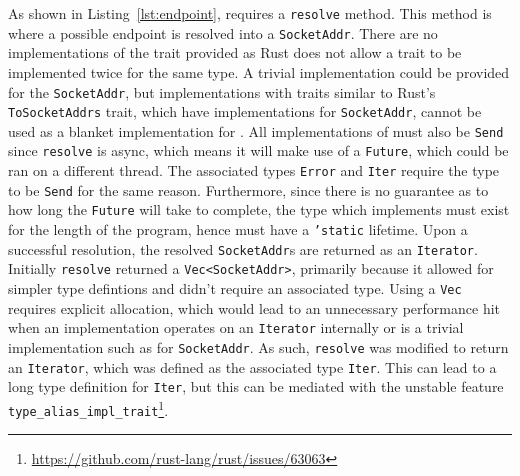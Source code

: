 As shown in Listing~\ref{lst:endpoint}, \Endpoint{} requires a \texttt{resolve} method.
This method is where a possible endpoint is resolved into a \texttt{SocketAddr}.
There are no implementations of the trait provided as Rust does not allow a trait to be implemented twice for the same
type.
A trivial implementation could be provided for the \texttt{SocketAddr}, but implementations with traits similar to
Rust's \texttt{ToSocketAddrs} trait, which have implementations for \texttt{SocketAddr}, cannot be used as a blanket
implementation for \Endpoint{}.
All implementations of \Endpoint{} must also be \texttt{Send} since \texttt{resolve} is async, which means it will
make use of a \texttt{Future}, which could be ran on a different thread.
The associated types \texttt{Error} and \texttt{Iter} require the type to be \texttt{Send} for the same reason.
Furthermore, since there is no guarantee as to how long the \texttt{Future} will take to complete, the type which
implements \Endpoint{} must exist for the length of the program, hence must have a \texttt{'static} lifetime.
Upon a successful resolution, the resolved \texttt{SocketAddr}s are returned as an \texttt{Iterator}.
Initially \texttt{resolve} returned a \texttt{Vec<SocketAddr>}, primarily because it allowed for simpler type defintions
and didn't require an associated type.
Using a \texttt{Vec} requires explicit allocation, which would lead to an unnecessary performance hit when an
implementation operates on an \texttt{Iterator} internally or is a trivial implementation such as for
\texttt{SocketAddr}.
As such, \texttt{resolve} was modified to return an \texttt{Iterator}, which was defined as the associated type
\texttt{Iter}.
This can lead to a long type definition for \texttt{Iter}, but this can be mediated with the unstable feature
\texttt{type\_alias\_impl\_trait}\footnote{\url{https://github.com/rust-lang/rust/issues/63063}}.

